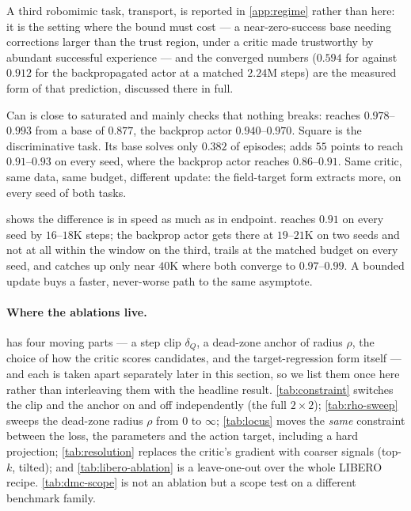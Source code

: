 A third robomimic task, transport, is reported in \cref{app:regime}
rather than here: it is the setting where the bound must cost --- a
near-zero-success base needing corrections larger than the trust region,
under a critic made trustworthy by abundant successful experience --- and
the converged numbers ($0.594$ for \method{} against $0.912$ for the
backpropagated actor at a matched $2.24$M steps) are the measured form of
that prediction, discussed there in full.

Can is close to saturated and mainly checks that nothing breaks: \method{}
reaches $0.978$--$0.993$ from a base of $0.877$, the backprop actor
$0.940$--$0.970$. Square is the discriminative task. Its base solves only
$0.382$ of episodes; \method{} adds $55$ points to reach $0.91$--$0.93$ on
every seed, where the backprop actor reaches $0.86$--$0.91$. Same critic,
same data, same budget, different update: the field-target form extracts
more, on every seed of both tasks.

 shows the difference is in speed as much as in endpoint.
\method{} reaches $0.91$ on every seed by $16$--$18$K steps; the backprop
actor gets there at $19$--$21$K on two seeds and not at all within the
window on the third, trails at the matched budget on every seed, and catches
up only near $40$K where both converge to $0.97$--$0.99$. A bounded update buys a faster, never-worse path to the same
asymptote.

\paragraph{Where the ablations live.} \method{} has four moving parts --- a
step clip $\delta_Q$, a dead-zone anchor of radius $\rho$, the choice of how
the critic scores candidates, and the target-regression form itself --- and
each is taken apart separately later in this section, so we list them once
here rather than interleaving them with the headline result.
\cref{tab:constraint} switches the clip and the anchor on and off
independently (the full $2\times2$); \cref{tab:rho-sweep} sweeps the
dead-zone radius $\rho$ from $0$ to $\infty$; \cref{tab:locus} moves the
\emph{same} constraint between the loss, the parameters and the action
target, including a hard projection; \cref{tab:resolution} replaces the
critic's gradient with coarser signals (top-$k$, tilted); and
\cref{tab:libero-ablation} is a leave-one-out over the whole LIBERO recipe.
\cref{tab:dmc-scope} is not an ablation but a scope test on a different
benchmark family.

